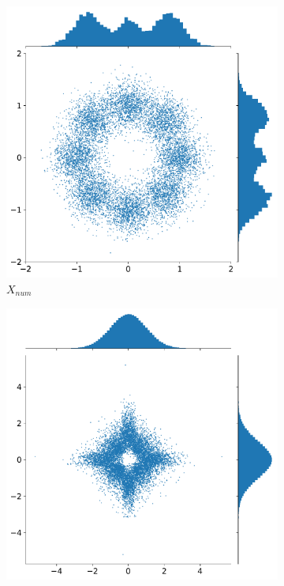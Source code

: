 \begin{figure}[htp]
\centering
\begin{subfigure}{0.3\textwidth}
\centering
    \includegraphics[width=\textwidth]{../Plots/Transformations/ring_joint_marginal_data.pdf}\quad
\caption{$X_{num}$}
\end{subfigure}
\begin{subfigure}{0.3\textwidth}
\centering
    \includegraphics[width=\textwidth]{../Plots/Transformations/ring_joint_marginal_quantile.pdf}

\end{subfigure}
\end{figure}
